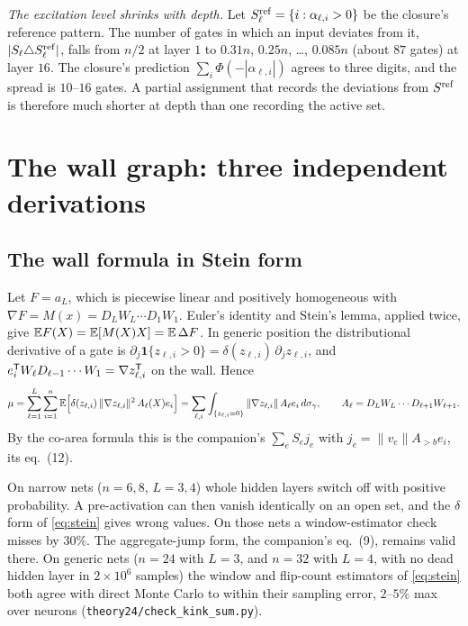 \emph{The excitation level shrinks with depth.} Let $S^{\rm ref}_\ell=\{i:\alpha_{\ell,i}>0\}$ be the closure's reference
pattern. The number of gates in which an input deviates from it, $|S_\ell\triangle S^{\rm ref}_\ell|$, falls from $n/2$
at layer $1$ to $0.31n$, $0.25n$, \dots, $0.085n$ (about $87$ gates) at layer $16$. The closure's prediction
$\sum_i\Phi(-|\alpha_{\ell,i}|)$ agrees to three digits, and the spread is $10$--$16$ gates. A partial assignment that
records the deviations from $S^{\rm ref}$ is therefore much shorter at depth than one recording the active set.

\section{The wall graph: three independent derivations}\label{sec:wall}

\subsection{The wall formula in Stein form}
Let $F=a_L$, which is piecewise linear and positively homogeneous with $\nabla F=M(x)=D_LW_L\cdots D_1W_1$. Euler's
identity and Stein's lemma, applied twice, give $\mathbb{E} F(X)=\mathbb{E}[M(X)X]=\mathbb{E}\,\Delta F$. In generic position the distributional
derivative of a gate is $\partial_j\mathbf 1\{z_{\ell,i}>0\}=\delta(z_{\ell,i})\,\partial_jz_{\ell,i}$, and $e_i^{\mathsf T}
W_\ell D_{\ell-1}\cdots W_1=\nabla z_{\ell,i}^{\mathsf T}$ on the wall. Hence
\begin{equation}\label{eq:stein}
\mu=\sum_{\ell=1}^L\sum_{i=1}^n\mathbb{E}\Big[\delta(z_{\ell,i})\,\|\nabla z_{\ell,i}\|^2\,A_\ell(X)e_i\Big]
=\sum_{\ell,i}\int_{\{z_{\ell,i}=0\}}\|\nabla z_{\ell,i}\|\,A_\ell e_i\,d\sigma_\gamma,\qquad
A_\ell=D_LW_L\cdots D_{\ell+1}W_{\ell+1}.
\end{equation}
By the co-area formula this is the companion's $\sum_eS_ej_e$ with $j_e=\|v_e\|A_{>b}e_i$, its eq.~(12).

\begin{remark}
On narrow nets ($n=6,8$, $L=3,4$) whole hidden layers switch off with positive probability. A pre-activation can then
vanish identically on an open set, and the $\delta$ form of \eqref{eq:stein} gives wrong values. On those nets a
window-estimator check misses by $30\%$. The aggregate-jump form, the companion's eq.~(9), remains valid there. On generic
nets ($n=24$ with $L=3$, and $n=32$ with $L=4$, with no dead hidden layer in $2\times10^6$ samples) the window and
flip-count estimators of \eqref{eq:stein} both agree with direct Monte Carlo to within their sampling error, $2$--$5\%$
max over neurons (\texttt{theory24/check\_kink\_sum.py}).
\end{remark}

